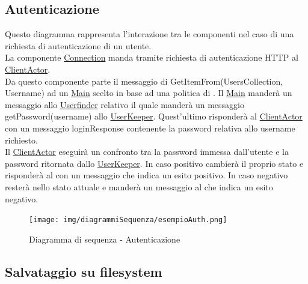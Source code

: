 \documentclass{scalatekids-article}
\begin{document}
\subsection{Autenticazione}

Questo diagramma rappresenta l'interazione tra le componenti nel caso di una richiesta di autenticazione di un utente.\\
La componente \hyperref[sec:actorbase::driver::client::Connection]{Connection}
manda tramite richiesta di autenticazione HTTP al \hyperref[sec:actorbase::actorsystem::clientactor::ClientActor]{ClientActor}.\\
Da questo componente parte il messaggio di GetItemFrom(UsersCollection, Username) ad un \hyperref[sec:actorbase::actorsystem::main::Main]{Main}
scelto in base ad una politica di .
Il \hyperref[sec:actorbase::actorsystem::main::Main]{Main} manderà un messaggio allo \hyperref[sec:actorbase::actorsystem::userfinder::Userfinder]{Userfinder}
relativo il quale manderà un messaggio getPassword(username) allo \hyperref[sec:actorbase::actorsystem::userkeeper::UserKeeper]{UserKeeper}.
Quest'ultimo risponderà al \hyperref[sec:actorbase::actorsystem::clientactor::ClientActor]{ClientActor} con un messaggio
loginResponse contenente la password relativa allo username richiesto.\\
Il \hyperref[sec:actorbase::actorsystem::clientactor::ClientActor]{ClientActor} eseguirà un confronto tra la password immessa dall'utente
e la password ritornata dallo \hyperref[sec:actorbase::actorsystem::userkeeper::UserKeeper]{UserKeeper}.
In caso positivo cambierà il proprio stato e risponderà al  con un messaggio che indica un esito positivo.
In caso negativo resterà nello stato attuale e manderà un messaggio al  che indica un esito negativo.
\begin{figure}[H]
  \begin{center}
    \texttt{[image: img/diagrammiSequenza/esempioAuth.png]}
    \caption{Diagramma di sequenza - Autenticazione}
  \end{center}
\end{figure}

\subsection{Salvataggio su filesystem}
\end{document}
